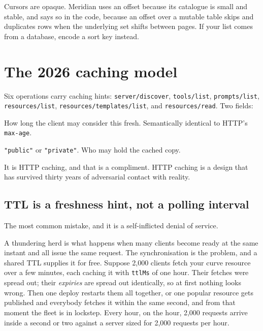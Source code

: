 Cursors are opaque. Meridian uses an offset because its catalogue is small and
stable, and says so in the code, because an offset over a mutable table skips
and duplicates rows when the underlying set shifts between pages. If your list
comes from a database, encode a sort key instead.

\section{The 2026 caching model}

Six operations carry caching hints: \texttt{server/discover},
\texttt{tools/list}, \texttt{prompts/list}, \texttt{resources/list},
\texttt{resources/templates/list}, and \texttt{resources/read}. Two fields:

\begin{description}[leftmargin=1.4em, style=nextline, itemsep=3pt]
\item[\texttt{ttlMs}] How long the client may consider this fresh. Semantically
identical to HTTP's \texttt{max-age}.
\item[\texttt{cacheScope}] \texttt{"public"} or \texttt{"private"}. Who may hold
the cached copy.
\end{description}

It is HTTP caching, and that is a compliment. HTTP caching is a design that has
survived thirty years of adversarial contact with reality.

\subsection{TTL is a freshness hint, not a polling interval}

The most common mistake, and it is a self-inflicted denial of service.


A thundering herd is what happens when many clients become ready at the same
instant and all issue the same request. The synchronisation is the problem, and
a shared TTL supplies it for free. Suppose 2,000 clients fetch your curve
resource over a few minutes, each caching it with \texttt{ttlMs} of one hour.
Their fetches were spread out; their \emph{expiries} are spread out identically,
so at first nothing looks wrong. Then one deploy restarts them all together, or
one popular resource gets published and everybody fetches it within the same
second, and from that moment the fleet is in lockstep. Every hour, on the hour,
2,000 requests arrive inside a second or two against a server sized for 2,000
requests per hour.


